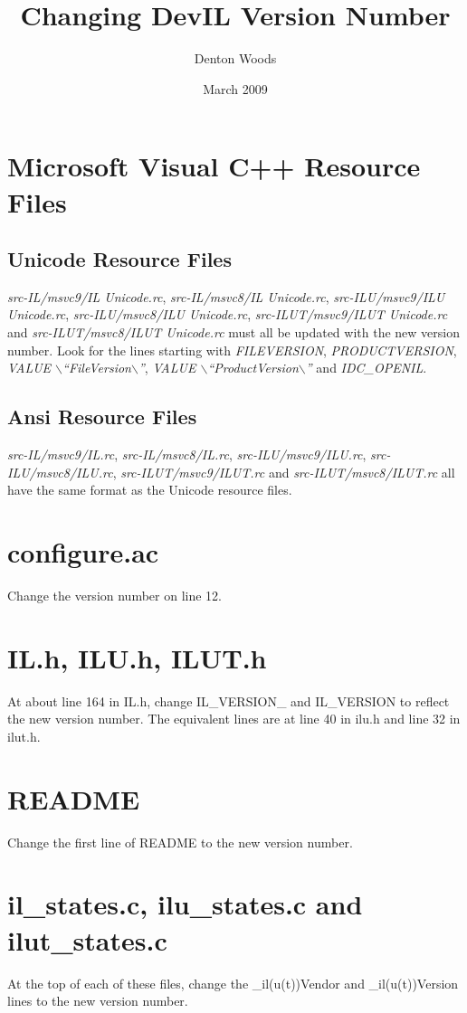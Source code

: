 \documentclass[letterpaper,10pt]{article}
\title{Changing DevIL Version Number}
\author{Denton Woods}
\date{March 2009}
\begin{document}
\maketitle

\section*{Microsoft Visual C++ Resource Files}
\subsection*{Unicode Resource Files}
\emph{src-IL/msvc9/IL Unicode.rc}, \emph{src-IL/msvc8/IL Unicode.rc}, \emph{src-ILU/msvc9/ILU Unicode.rc}, \emph{src-ILU/msvc8/ILU Unicode.rc}, \emph{src-ILUT/msvc9/ILUT Unicode.rc} and \emph{src-ILUT/msvc8/ILUT Unicode.rc} must all be updated with the new version number.  Look for the lines starting with \emph{FILEVERSION}, \emph{PRODUCTVERSION}, \emph{VALUE $\backslash$``FileVersion$\backslash$''}, \emph{VALUE $\backslash$``ProductVersion$\backslash$''} and \emph{IDC\_OPENIL}.

\subsection*{Ansi Resource Files}
\emph{src-IL/msvc9/IL.rc}, \emph{src-IL/msvc8/IL.rc}, \emph{src-ILU/msvc9/ILU.rc}, \emph{src-ILU/msvc8/ILU.rc}, \emph{src-ILUT/msvc9/ILUT.rc} and \emph{src-ILUT/msvc8/ILUT.rc} all have the same format as the Unicode resource files.


\section*{configure.ac}
Change the version number on line 12.


\section*{IL.h, ILU.h, ILUT.h}
At about line 164 in IL.h, change IL\_VERSION\_ and IL\_VERSION to reflect the new version number.  The equivalent lines are at line 40 in ilu.h and line 32 in ilut.h.


\section*{README}
Change the first line of README to the new version number.


\section*{il\_states.c, ilu\_states.c and ilut\_states.c}
At the top of each of these files, change the \_il(u(t))Vendor and \_il(u(t))Version lines to the new version number.
 
\end{document}
